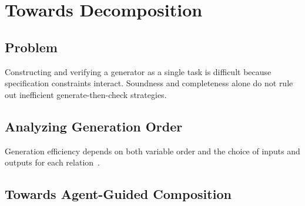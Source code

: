 \section{Towards Decomposition}
\label{sec:decomposition}

\subsection{Problem}
\label{sec:decomposition-problem}

Constructing and verifying a generator as a single task is difficult because specification constraints interact.
Soundness and completeness alone do not rule out inefficient generate-then-check strategies.

\subsection{Analyzing Generation Order}
\label{sec:generation-order}

Generation efficiency depends on both variable order and the choice of inputs and outputs for each relation~\cite{mittelman26testing}.

\subsection{Towards Agent-Guided Composition}
\label{sec:decomposition-solution}

